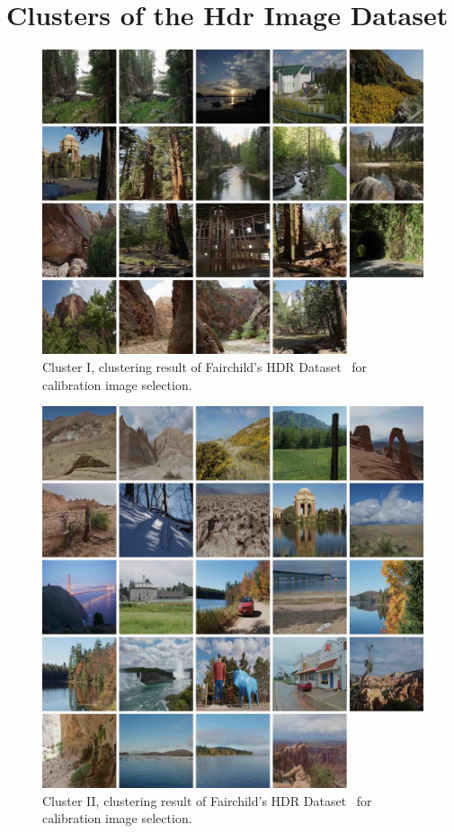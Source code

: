 \chapter{Clusters of the Hdr Image Dataset}
\label{app:clusters}

\begin{figure}[h!]
\begin{center}
\includegraphics[width=\textwidth]{appendix1/cluster1_small.jpg}
\caption{Cluster I, clustering result of Fairchild's HDR Dataset~\cite{fairchild2007hdr} for calibration image selection.}
\end{center}
\end{figure}

\begin{figure}
\begin{center}
\includegraphics[width=\textwidth]{appendix1/cluster2_small.jpg}
\caption{Cluster II, clustering result of Fairchild's HDR Dataset~\cite{fairchild2007hdr} for calibration image selection.}
\end{center}
\end{figure}

